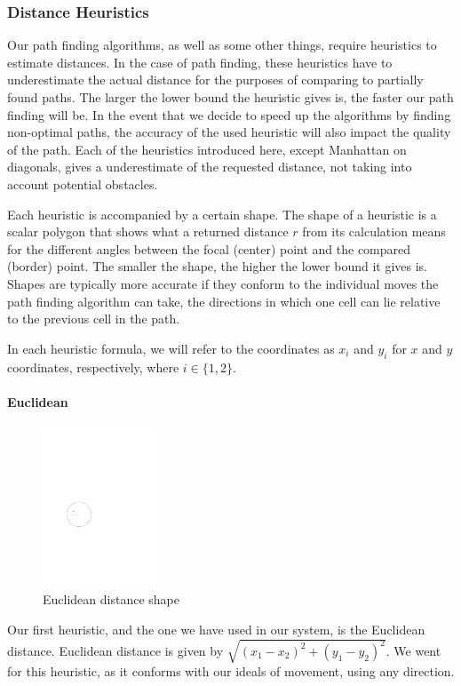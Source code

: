 \subsubsection{Distance Heuristics}
Our path finding algorithms, as well as some other things, require heuristics to estimate distances. In the case of path finding, these heuristics have to underestimate the actual distance for the purposes of comparing to partially found paths. The larger the lower bound the heuristic gives is, the faster our path finding will be. In the event that we decide to speed up the algorithms by finding non-optimal paths, the accuracy of the used heuristic will also impact the quality of the path. Each of the heuristics introduced here, except Manhattan on diagonals, gives a underestimate of the requested distance, not taking into account potential obstacles. 

Each heuristic is accompanied by a certain shape. The shape of a heuristic is a scalar polygon that shows what a returned distance $r$ from its calculation means for the different angles between the focal (center) point and the compared (border) point. The smaller the shape, the higher the lower bound it gives is. Shapes are typically more accurate if they conform to the individual moves the path finding algorithm can take, the directions in which one cell can lie relative to the previous cell in the path. 

In each heuristic formula, we will refer to the coordinates as $x_i$ and $y_i$ for $x$ and $y$ coordinates, respectively, where $i \in \{ 1, 2\}$.

\paragraph{Euclidean}
\label{sec:euclidean}
\begin{figure}
\includegraphics[width=0.30\textwidth]{images/euclidean_unit.pdf}
\caption{Euclidean distance shape}
\end{figure}
Our first heuristic, and the one we have used in our system, is the Euclidean distance. Euclidean distance is given by $\sqrt{(x_1 - x_2)^2 + (y_1 - y_2)^2}$. We went for this heuristic, as it conforms with our ideals of movement, using any direction.


